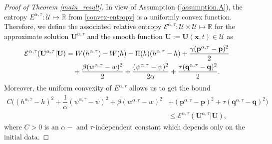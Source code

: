 \documentclass[11pt]{article}
\numberwithin{equation}{section}
\newtheorem{counter example}[theorem]{Counter Example}
\numberwithin{equation}{section}
\numberwithin{equation}{section}
\newcommand{\rel}{^{\alpha, \tau}}
\begin{document}
\begin{proof}[Proof of Theorem \ref{main_result}]
In view of Assumption (\ref{assumption.A}), the entropy $E^{\alpha, \tau}:\mathcal{U}\mapsto \mathbb{R}$ from \eqref{convex-entropy} is a uniformly convex function. Therefore, we define the associated  relative entropy $\mathcal{E}^{\alpha, \tau}:\mathcal{U}\times \mathcal{U}\mapsto \mathbb{R}$ for the approximate solution ${\mathbf U}\rel$  and the smooth function $\mathbf{{U}}:= \mathbf{U}(\mathbf{x}, t)\in \mathcal{U}$ as \\
\begin{align}\label{rel_entropy_hyp_system} \hspace*{-0.3cm}
    \mathcal{E}^{\alpha, \tau}(\mathbf{U}\rel| \mathbf{ U})&=W(h\rel)-W({h})-\Pi({h})(h\rel-{h})+\dfrac{\gamma (\mathbf{p}\rel-\mathbf{{p}})^2}{2}\nonumber\\
    &\quad+\dfrac{ \beta(w\rel-{w})^2}{2}+\dfrac{(\psi\rel-{\psi})^2}{2\alpha}+\dfrac{\tau(\mathbf{q\rel-{q}})^2}{2}.
\end{align}
Moreover, the uniform convexity of $E\rel$ allows us to get the bound \\
\begin{align}\label{relative_entropy_relation_main}
    C\bigg((h\rel-{h})^2+\dfrac{1}{\alpha}(\psi\rel-{\psi})^2+\beta(w\rel-{w})^2&+(\mathbf{p}\rel-{\mathbf{p}})^2+\tau (\mathbf{q}\rel-\mathbf{{q}})^2\bigg)\nonumber\\
    &\leq \mathcal{E}^{\alpha, \tau}(\mathbf{U}\rel|\mathbf{{U}}),
\end{align}
where $C>0$ is an $\alpha-$ and $\tau$-independent constant which depends only on the initial data.


\end{proof}
\end{document}
